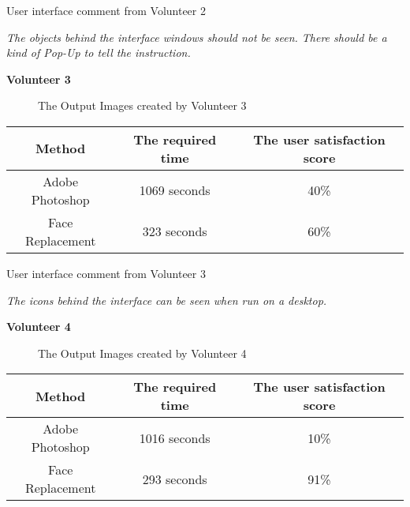 \vspace{0.2in}\noindent User interface comment from Volunteer 2

\emph{The objects behind the interface windows should not be seen. There should be a kind of Pop-Up to tell the instruction.}

\vspace{0.2in}\noindent \textbf{Volunteer 3}
\begin{figure}[htb]
  \centering
  \caption{The Output Images created by Volunteer 3}
  \label{fig:Result3}
\end{figure}

\vspace{1.0in}
\begin{center}
\begin{tabular}{|c|c|c|}
  \hline
  Method & The required time & The user satisfaction score \\ \hline
  Adobe Photoshop & 1069 seconds & 40\% \\ \hline
  Face Replacement & 323 seconds & 60\% \\
  \hline
\end{tabular}
\end{center}

\vspace{0.2in}\noindent User interface comment from Volunteer 3

\emph{The icons behind the interface can be seen when run on a desktop.}

\vspace{0.2in}\noindent \textbf{Volunteer 4}
\begin{figure}[htb]
  \centering
  \caption{The Output Images created by Volunteer 4}
  \label{fig:Result4}
\end{figure}

\begin{center}
\begin{tabular}{|c|c|c|}
  \hline
  Method & The required time & The user satisfaction score \\ \hline
  Adobe Photoshop & 1016 seconds & 10\% \\ \hline
  Face Replacement & 293 seconds & 91\% \\
  \hline
\end{tabular}
\end{center}

